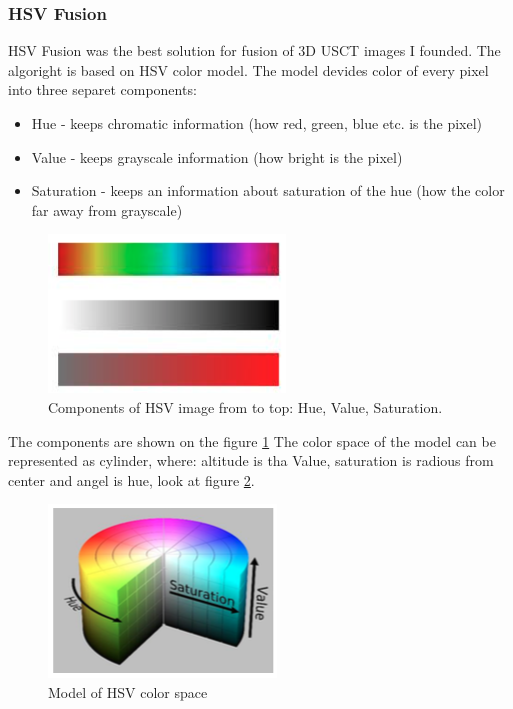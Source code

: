 \documentclass[english]{article}
\begin{document}
\subsubsection{HSV Fusion}

HSV Fusion was the best solution for fusion of 3D USCT images I founded. The algoright is based on HSV color model. The model devides color of every pixel into three separet components:

\begin{itemize}
\item Hue - keeps chromatic information (how red, green, blue etc. is the pixel)
\item Value - keeps grayscale information (how bright is the pixel)
\item Saturation - keeps an information about saturation of the hue (how the color far away from grayscale)
\end{itemize}

\begin{figure}[H]
\centerline{\includegraphics[scale=0.6]{internship_report/hsv}}
\caption{Components of HSV image from to top: Hue, Value, Saturation.\label{fig:hsv}}
\end{figure}

The components are shown on the figure \ref{fig:hsv} The color space of the model can be represented as cylinder, where: altitude is tha Value, saturation is radious from center and angel is hue, look at figure \ref{fig:model}.\\

\begin{figure}[H]
\centerline{\includegraphics[scale=0.6]{internship_report/model}}
\caption{Model of HSV color space\label{fig:model}}
\end{figure}
\end{document}

